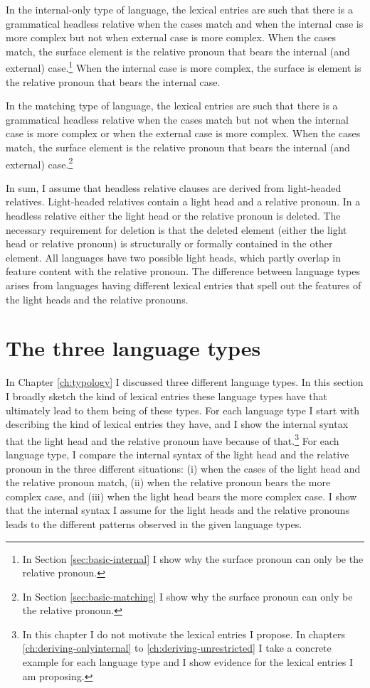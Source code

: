 In the internal-only type of language, the lexical entries are such that there is a grammatical headless relative when the cases match and when the internal case is more complex but not when external case is more complex. When the cases match, the surface element is the relative pronoun that bears the internal (and external) case.\footnote{
In Section \ref{sec:basic-internal} I show why the surface pronoun can only be the relative pronoun.
}
When the internal case is more complex, the surface is element is the relative pronoun that bears the internal case.

In the matching type of language, the lexical entries are such that there is a grammatical headless relative when the cases match but not when the internal case is more complex or when the external case is more complex. When the cases match, the surface element is the relative pronoun that bears the internal (and external) case.\footnote{
In Section \ref{sec:basic-matching} I show why the surface pronoun can only be the relative pronoun.
}

In sum, I assume that headless relative clauses are derived from light-headed relatives. Light-headed relatives contain a light head and a relative pronoun. In a headless relative either the light head or the relative pronoun is deleted.
The necessary requirement for deletion is that the deleted element (either the light head or relative pronoun) is structurally or formally contained in the other element.
All languages have two possible light heads, which partly overlap in feature content with the relative pronoun.
The difference between language types arises from languages having different lexical entries that spell out the features of the light heads and the relative pronouns.


\section{The three language types}\label{sec:three-types}

In Chapter \ref{ch:typology} I discussed three different language types. In this section I broadly sketch the kind of lexical entries these language types have that ultimately lead to them being of these types.
For each language type I start with describing the kind of lexical entries they have, and I show the internal syntax that the light head and the relative pronoun have because of that.\footnote{
In this chapter I do not motivate the lexical entries I propose. In chapters \ref{ch:deriving-onlyinternal} to \ref{ch:deriving-unrestricted} I take a concrete example for each language type and I show evidence for the lexical entries I am proposing.}
For each language type, I compare the internal syntax of the light head and the relative pronoun in the three different situations: (i) when the cases of the light head and the relative pronoun match, (ii) when the relative pronoun bears the more complex case, and (iii) when the light head bears the more complex case.
I show that the internal syntax I assume for the light heads and the relative pronouns leads to the different patterns observed in the given language types.


